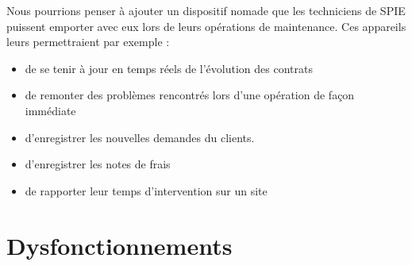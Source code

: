 Nous pourrions penser à ajouter un dispositif nomade que les techniciens de SPIE puissent emporter avec eux lors de leurs opérations de maintenance.
Ces appareils leurs permettraient par exemple :

\begin{itemize}
\item de se tenir à jour en temps réels de l'évolution des contrats
\item de remonter des problèmes rencontrés lors d'une opération de façon immédiate
\item d'enregistrer les nouvelles demandes du clients.
\item d'enregistrer les notes de frais
\item de rapporter leur temps d'intervention sur un site
\end{itemize}

\section{Dysfonctionnements}

